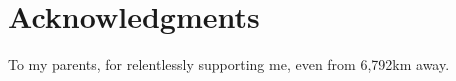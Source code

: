 \chapter*{Acknowledgments}

To my parents, for relentlessly supporting me, even from 6,792km away.

